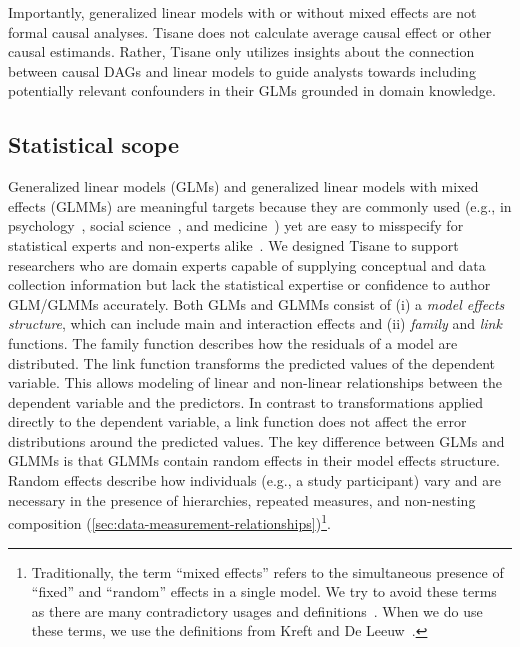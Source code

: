 Importantly, generalized linear models with or without mixed effects are not
formal causal analyses. Tisane does not calculate average causal effect or other
causal estimands. Rather, Tisane only utilizes insights about the connection
between causal DAGs and linear models to guide analysts towards including
potentially relevant confounders in their GLMs grounded in domain knowledge. 


\subsection{Statistical scope}  \label{sec:GLM}

Generalized linear models (GLMs) and generalized linear models with mixed
effects (GLMMs) are meaningful targets because they are commonly used (e.g., in
psychology~\cite{lo2015transform,cohen2013applied}, social
science~\cite{kreft1998introducing}, and
medicine~\cite{bolker2009generalized,barr2013random}) yet are easy to misspecify
for statistical experts and non-experts alike~\cite{barr2013random,
cohen2013applied}. We designed Tisane to support researchers who are domain
experts capable of supplying conceptual and data collection information but lack
the statistical expertise or confidence to author GLM/GLMMs accurately.
Both GLMs and GLMMs consist of (i) a \textit{model effects structure},
which can include main and interaction effects and (ii) \textit{family} and
\textit{link} functions. The family function describes how the residuals of a
model are distributed. The link function transforms the predicted values of the
dependent variable. This allows modeling of linear and non-linear relationships
between the dependent variable and the predictors. In contrast to
transformations applied directly to the dependent variable, a link function does
not affect the error distributions around the predicted values. The key
difference between GLMs and GLMMs is that GLMMs contain random effects in their
model effects structure. Random effects describe how individuals (e.g., a study
participant) vary and are necessary in the presence of hierarchies, repeated
measures, and non-nesting composition
(\ref{sec:data-measurement-relationships})\footnote{Traditionally, the term
``mixed effects'' refers to the simultaneous presence of ``fixed'' and
``random'' effects in a single model. We try to avoid these terms as there are
many contradictory usages and definitions~\cite{gelmanFixedRandom}. When we do
use these terms, we use the definitions from Kreft and De
Leeuw~\cite{kreft1998introducing}.}.

